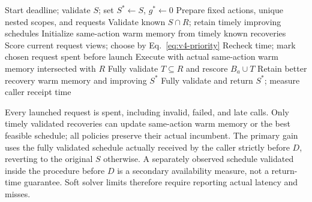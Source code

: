 \begin{algorithm}[t]
\caption{Finite joint-recovery allocation}
\label{alg:v4-recovery}
\begin{algorithmic}[1]
\State Start deadline; validate $S$; set $S^*\gets S$, $g^*\gets0$
\State Prepare fixed actions, unique nested scopes, and requests
\State Validate known $S\cap R$; retain timely improving schedules
\State Initialize same-action warm memory from timely known recoveries
  \State Score current request views; choose by Eq.~\eqref{eq:v4-priority}
  \State Recheck time; mark chosen request spent before launch
  \State Execute with actual same-action warm memory intersected with $R$
  \State Fully validate $T\subseteq R$ and rescore $B_a\cup T$
    \State Retain better recovery warm memory and improving $S^*$
  \EndIf
\EndWhile
\State Fully validate and return $S^*$; measure caller receipt time
\end{algorithmic}
\end{algorithm}

Every launched request is spent, including invalid, failed, and late calls.
Only timely validated recoveries can update same-action warm memory or the
best feasible schedule; all policies preserve their actual incumbent.
The primary gain uses the fully validated schedule actually received by
the caller strictly before $D$, reverting to the original $S$ otherwise.
A separately observed schedule validated inside the procedure before $D$
is a secondary availability measure, not a return-time guarantee.
Soft solver limits therefore require reporting actual latency and misses.
